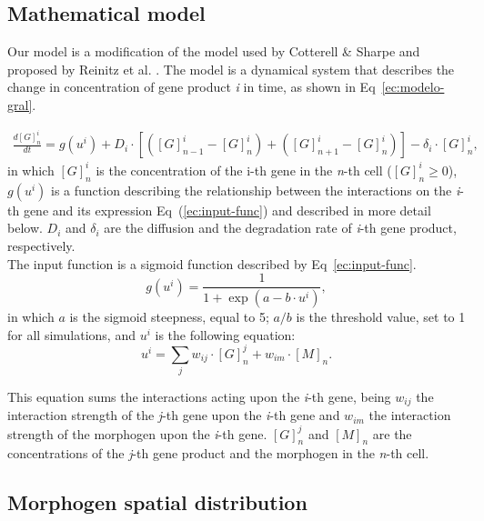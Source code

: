 \documentclass[10pt,letterpaper]{article}
\begin{document}
\subsection*{Mathematical model}

Our model is a modification of the model used by Cotterell \& Sharpe 
\cite{Cotterell2010} and proposed by Reinitz et al. \cite{Reinitz1995}. The 
model is a dynamical system that describes the change in concentration of gene 
product \emph{i} in time, as shown in Eq~\ref{ec:modelo-gral}.

 \begin{eqnarray}
  \frac{d[G]^i_n}{dt}
  = g(u^i) + D_i \cdot [ ([G]^i_{n-1}-[G]^i_n) +([G]^i_{n+1}-[G]^i_n)]-\delta_i 
  \cdot [ G ]^i_n ,
  \label{ec:modelo-gral}
 \end{eqnarray}
\noindent
in which $[G]^{i}_{n}$ is the concentration of the i-th gene in the \emph{n}-th 
cell ($[G]^{i}_{n} ≥ 0$), $g(u^i)$ is a function describing the relationship 
between the interactions on the \emph{i}-th gene and its expression 
Eq~(\ref{ec:input-func}) and described in more detail below. $D_i$ and 
$\delta_i$ are the diffusion and the degradation rate of \emph{i}-th gene 
product, respectively.\\

The input function is a sigmoid function described by Eq~\ref{ec:input-func}.
\begin{equation}
 g(u^i) = \frac{1}{1 + \exp(a - b \cdot u^i)},
 \label{ec:input-func}
\end{equation}
\noindent
in which $a$ is the sigmoid steepness, equal to 5; $a/b$ is the threshold value,
set to 1 for all simulations, and $u^i$ is the following equation:
\begin{equation}
 u^i = \sum_j w_{ij} \cdot [G]^j_n + w_{im} \cdot [M]_n.
 \label{ec:mat-sum}
\end{equation}

This equation sums the interactions acting upon the \emph{i}-th gene, being 
$w_{ij}$ the interaction strength of the \emph{j}-th gene upon the \emph{i}-th 
gene and $w_{im}$ the interaction strength of the morphogen upon the \emph{i}-th
gene. $[G]^j_n$ and $[M]_n$ are the concentrations of the \emph{j}-th gene 
product and the morphogen in the \emph{n}-th cell.

\subsection*{Morphogen spatial distribution}
\end{document}
